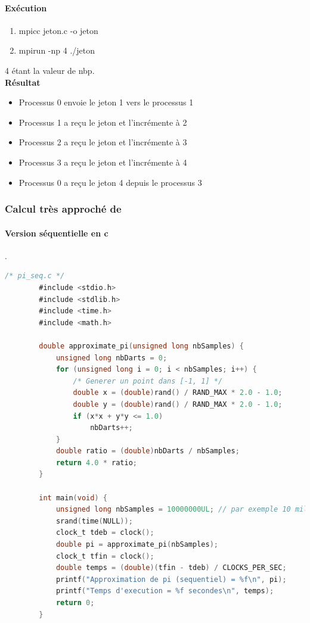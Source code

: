 \documentclass[a4paper,13pt]{book}
\begin{document}
\paragraph{Exécution}
\begin{enumerate}
    \item mpicc jeton.c -o jeton
    \item mpirun -np 4 ./jeton
\end{enumerate}
4 étant la valeur de nbp.\\
\textbf{Résultat}
\begin{itemize}
\item Processus 0 envoie le jeton 1 vers le processus 1
\item Processus 1 a reçu le jeton et l'incrémente à 2
\item Processus 2 a reçu le jeton et l'incrémente à 3
\item Processus 3 a reçu le jeton et l'incrémente à 4
\item Processus 0 a reçu le jeton 4 depuis le processus 3
\end{itemize}
\subsubsection{Calcul très approché de \pi}
\paragraph{Version séquentielle en c}.\\

	\begin{lstlisting}[language=C]
        /* pi_seq.c */
        #include <stdio.h>
        #include <stdlib.h>
        #include <time.h>
        #include <math.h>
        
        double approximate_pi(unsigned long nbSamples) {
            unsigned long nbDarts = 0;
            for (unsigned long i = 0; i < nbSamples; i++) {
                /* Generer un point dans [-1, 1] */
                double x = (double)rand() / RAND_MAX * 2.0 - 1.0;
                double y = (double)rand() / RAND_MAX * 2.0 - 1.0;
                if (x*x + y*y <= 1.0)
                    nbDarts++;
            }
            double ratio = (double)nbDarts / nbSamples;
            return 4.0 * ratio;
        }
        
        int main(void) {
            unsigned long nbSamples = 10000000UL; // par exemple 10 millions de points
            srand(time(NULL));
            clock_t tdeb = clock();
            double pi = approximate_pi(nbSamples);
            clock_t tfin = clock();
            double temps = (double)(tfin - tdeb) / CLOCKS_PER_SEC;
            printf("Approximation de pi (sequentiel) = %f\n", pi);
            printf("Temps d'execution = %f secondes\n", temps);
            return 0;
        }
        
        
\end{lstlisting}
\end{document}
